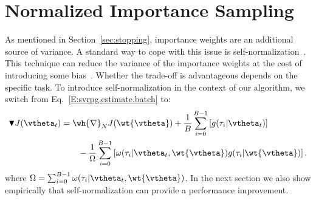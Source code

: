 \section{Normalized Importance Sampling}\label{sec:prac}
\vspace{-0.05in}
As mentioned in Section~\ref{sec:stopping}, importance weights are an additional source of variance. A standard way to cope with this issue is self-normalization~\citep[\eg][]{precup2000eligibility,owenmcbook}.
This technique can reduce the variance of the importance weights at the cost of introducing some bias~\citep[][Chapter 9]{owenmcbook}.
Whether the trade-off is advantageous depends on the specific task.  
To introduce self-normalization in the context of our algorithm, we switch from Eq.~\eqref{E:svrpg.estimate.batch} to:
\begin{align*}
\blacktriangledown J(\vtheta_{t}) &= \wh{\nabla}_N J(\wt{\vtheta}) + \frac{1}{B} \sum_{i=0}^{B-1} \left[g(\tau_i|\vtheta_t)\right]\\ 
&\qquad{} - \frac{1}{\Omega} \sum_{i=0}^{B-1} \left[ \omega(\tau_i|\vtheta_t, \wt{\vtheta}) g(\tau_i|\wt{\vtheta})
\right].
\end{align*}
where $\Omega = \sum_{i=0}^{B-1}\omega(\tau_i|\vtheta_t, \wt{\vtheta})$.
In the next section we also show empirically that self-normalization can provide a performance improvement.

\vspace{-0.05in}
